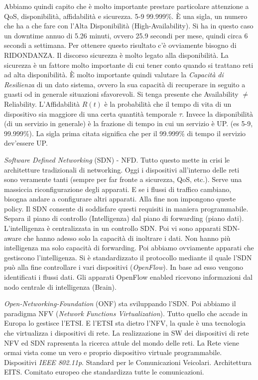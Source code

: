 Abbiamo quindi capito che è molto importante prestare particolare attenzione a QoS, disponibilità, affidabilità e sicurezza.
5-9 99.999\%. \`E una sigla, un numero che ha a che fare con l'Alta Disponibilità (High-Availability). Si ha in questo caso un downtime annuo di 5.26 minuti, ovvero 25.9 secondi per mese, quindi circa 6 secondi a settimana. Per ottenere questo risultato c'è ovviamente bisogno di RIDONDANZA. Il discorso sicurezza è molto legato alla disponibilità. La sicurezza è un fattore molto importante di cui tener conto quando si trattano reti ad alta disponibilità. \`E molto importante quindi valutare la \textit{Capacità di Resilienza} di un dato sistema, ovvero la sua capacità di recuperare in seguito a guasti od in generale situazioni sfavorevoli. Si tenga presente che Availability $\neq$ Reliability. L'Affidabilità $R(t)$ è la probabilità che il tempo di vita di un dispositivo sia maggiore di una certa quantità temporale $\tau$. Invece la disponibilità (di un servizio in generale) è la frazione di tempo in cui un servizio è UP. (es 5-9, 99.999\%). La sigla prima citata significa che per il 99.999\% di tempo il servizio dev'essere UP.

\textit{Software Defined Networking} (SDN) - NFD. Tutto questo mette in crisi le architetture tradizionali di networking. Oggi i dispositivi all'interno delle reti sono veramente tanti (sempre per far fronte a sicurezza, QoS, etc.). Serve una massiccia riconfigurazione degli apparati. E se i flussi di traffico cambiano, bisogna andare a configurare altri apparati. Alla fine non impongono queste policy. Il SDN consente di soddisfare questi requisiti in maniera programmabile. Separa il piano di controllo (Intelligenza) dal piano di forwarding (piano dati). L'intelligenza è centralizzata in un controllo SDN. Poi vi sono apparati SDN-aware che hanno adesso solo la capacità di inoltrare i dati. Non hanno più intelligenza ma solo capacità di forwarding. Poi abbiamo ovviamente apparati che gestiscono l'intelligenza. Si è standardizzato il protocollo mediante il quale l'SDN può alla fine controllare i vari dispositivi (\textit{OpenFlow}). In base ad esso vengono identificati i flussi dati. Gli apparati OpenFlow enabled ricevono informazioni dal nodo centrale di intelligenza (Brain).

\textit{Open-Networking-Foundation} (ONF) sta sviluppando l'SDN. Poi abbiamo il paradigma NFV (\textit{Network Functions Virtualization}). Tutto quello che accade in Europa lo gestisce l'ETSI. E l'ETSI sta dietro l'NFV, la quale è una tecnologia che virtualizza i dispositivi di rete. La realizzazione in SW dei dispositivi di rete NFV ed SDN rapresenta la ricerca attule del mondo delle reti. La Rete viene ormai vista come un vero e proprio dispositivo virtuale programmabile.
Dispositivi \textit{IEEE 802.11p}. Standard per le Comunicazioni Veicolari. Architettura EITS. Comitato europeo che standardizza tutte le comunicazioni.
